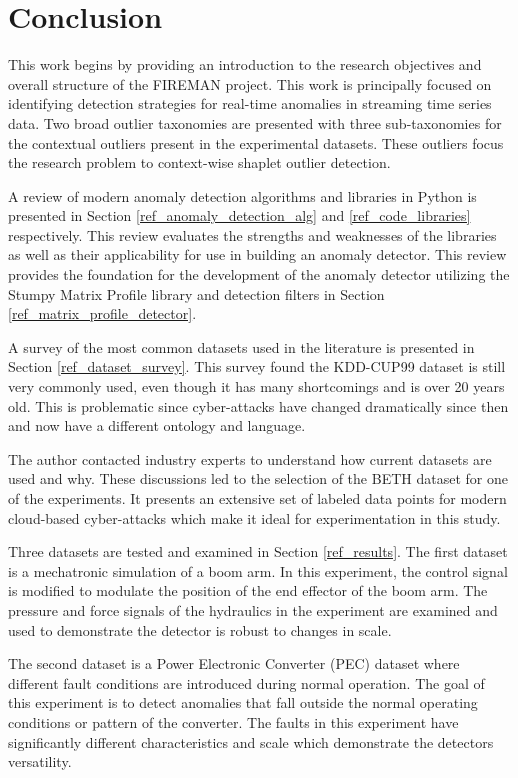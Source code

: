 \section{Conclusion}
\label{sec:conclusion}

This work begins by providing an introduction to the research objectives and overall structure of the FIREMAN project.
This work is principally focused on identifying detection strategies for real-time anomalies in streaming time series data.
Two broad outlier taxonomies are presented with three sub-taxonomies for the contextual outliers present in the experimental datasets.
These outliers focus the research problem to context-wise shaplet outlier detection.

A review of modern anomaly detection algorithms and libraries in Python is presented in Section \ref{ref_anomaly_detection_alg} and \ref{ref_code_libraries} respectively.
This review evaluates the strengths and weaknesses of the libraries as well as their applicability for use in building an anomaly detector.
This review provides the foundation for the development of the anomaly detector utilizing the Stumpy Matrix Profile library and detection filters in Section \ref{ref_matrix_profile_detector}. 

A survey of the most common datasets used in the literature is presented in Section \ref{ref_dataset_survey}.
This survey found the KDD-CUP99 dataset is still very commonly used, even though it has many shortcomings and is over 20 years old.
This is problematic since cyber-attacks have changed dramatically since then and now have a different ontology and language.

The author contacted industry experts to understand how current datasets are used and why.
These discussions led to the selection of the BETH dataset for one of the experiments.
It presents an extensive set of labeled data points for modern cloud-based cyber-attacks which make it ideal for experimentation in this study.

Three datasets are tested and examined in Section \ref{ref_results}.
The first dataset is a mechatronic simulation of a boom arm.
In this experiment, the control signal is modified to modulate the position of the end effector of the boom arm.
The pressure and force signals of the hydraulics in the experiment are examined and used to demonstrate the detector is robust to changes in scale.

The second dataset is a Power Electronic Converter (PEC) dataset where different fault conditions are introduced during normal operation.
The goal of this experiment is to detect anomalies that fall outside the normal operating conditions or pattern of the converter.
The faults in this experiment have significantly different characteristics and scale which demonstrate the detectors versatility.

